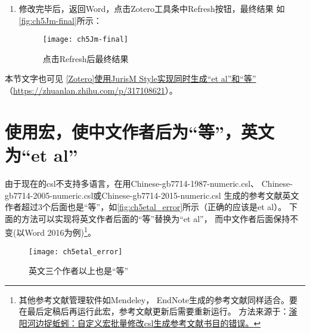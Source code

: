 \documentclass[cn,11pt,chinese]{elegantbook}
\begin{document}
\begin{enumerate}
			如果不正常，在Zotero库中将英文文献的“Language”字段修改为“en”
			\footnote{我遇到的不正常的情况是英文作者后面也是“等”，如果中文作者后面
			成了“et al”，可以尝试修改中文文献的“Language”字段修改为“cn”或“中文”试试。}，
			如\autoref{fig:ch5JmLanguage}所示：
			\begin{figure}[htbp]
				\centering
				\texttt{[image: ch5JmLanguage]}
				\caption{将英文文献的“Language”字段修改为“en”}
				\label{fig:ch5JmLanguage}
			\end{figure}
			\item 修改完毕后，返回Word，点击Zotero工具条中Refresh按钮，最终结果
			如\autoref{fig:ch5Jm-final}所示：
			\begin{figure}[htbp]
				\centering
				\texttt{[image: ch5Jm-final]}
				\caption{点击Refresh后最终结果}
				\label{fig:ch5Jm-final}
			\end{figure}
			\end{enumerate}
		
			本节文字也可见
		\href{https://zhuanlan.zhihu.com/p/317108621}
		{[Zotero]使用JurisM Style实现同时生成“et al”和“等”}
		（\url{https://zhuanlan.zhihu.com/p/317108621}）。

		\section{使用宏，使中文作者后为“等”，英文为“et al”}\label{sec:etal}
			由于现在的csl不支持多语言，在用Chinese-gb7714-1987-numeric.csl、
			Chinese-gb7714-2005-numeric.csl或Chinese-gb7714-2015-numeric.csl
			生成的参考文献英文作者超过3个后面也是“等”，如\autoref{fig:ch5etal_error}所示（正确的应该是et al）。
			下面的方法可以实现将英文作者后面的“等”替换为“et al”，
			而中文作者后面保持不变(以Word 2016为例)\footnote{其他参考文献管理软件如Mendeley，
			EndNote生成的参考文献同样适合。要在最后定稿后再运行此宏，参考文献更新后需要重新运行。
			方法来源于：\href{https://zhuanlan.zhihu.com/p/53594081}
			{滏阳河边捉蚯蚓：自定义宏批量修改csl生成参考文献书目的错误。}}。
			\begin{figure}[htbp]
				\centering
				\texttt{[image: ch5etal\_error]}
				\caption{英文三个作者以上也是“等”}
				\label{fig:ch5etal_error}
			\end{figure}
		
\end{document}
